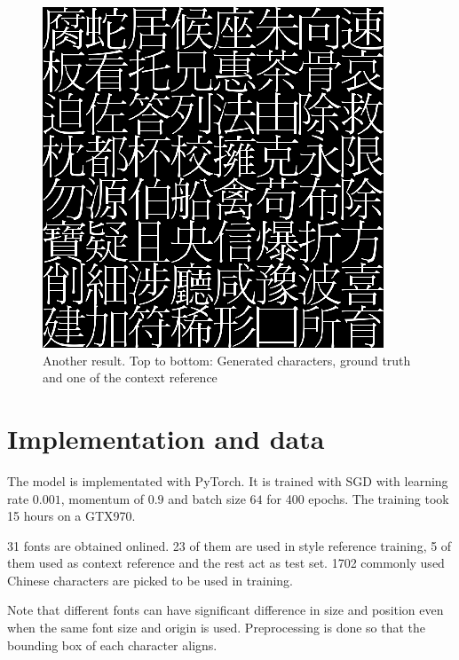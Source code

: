 \documentclass[10pt,twocolumn,letterpaper]{article}
\begin{document}
\begin{figure}[t]
\begin{center}
		\includegraphics[width=0.8\linewidth]{380r1.png}
	\end{center}
	\caption{Another result. Top to bottom: Generated characters, ground truth and one of the context reference}
	\label{fig:long}
	\label{fig:onecol}
\end{figure}

\section{Implementation and data}
The model is implementated with PyTorch. It is trained with SGD with learning rate $0.001$, momentum of $0.9$ and batch size $64$ for 400 epochs. The training took 15 hours on a GTX970.

31 fonts are obtained onlined. 23 of them are used in style reference training, 5 of them used as context reference and the rest act as test set. 1702 commonly used Chinese characters are picked to be used in training.

Note that different fonts can have significant difference in size and position even when the same font size and origin is used. Preprocessing is done so that the bounding box of each character aligns.

{\small


}
\end{document}
